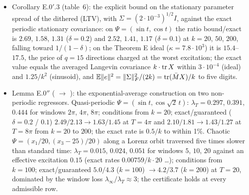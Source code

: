 \begin{itemize}
    regressors, the envelope along trajectories, the ordering explicit $\le$ exact, the $\omega^{-2}$ law, the
    no-growth of the ratio as the gains shrink, and the explicit nonlinear envelope of Theorem E on the implemented
    closed loop (single-kernel instance with $G=0.3\,I$, where $r_0\approx10^{-5}$ in the $w$-coordinates and the
    explicit nonlinear rate is $3.7\cdot10^{-5}$: the inequality holds at every sample over 8000\,s, about 0.3
    e-folds of the explicit envelope, while the state itself decays by far more). Lemma E.0$'$: the certificate and
    the sharpness on $\Psi=(\sin t,\cos t)$ ($k=20$, $50$, $200$; ratio $\to1/(1-\delta)$) and on the slow-adaptation
    ideal at $k=400$ (ratio $\le1.5$; more than $10^4$ above Lemma E.0's rate). Corollary E.0$'$.2: the explicit
    envelope on the implemented single-kernel loop at $k_e=40$ over 1.5 e-folds ($\mathrm{d}t=0.005$, below the
    fixed-step discretisation floor).
  \item Corollary E.0$'$.3 (table~6): the explicit bound on the stationary parameter spread of the dithered (LTV),
    with $\Sigma=(2\cdot10^{-3})^{1/2}I$, against the exact periodic stationary covariance: on $\Psi=(\sin t,\cos t)$
    the ratio bound/exact is $2.69$, $1.58$, $1.31$ ($\delta=0.2$) and $2.52$, $1.41$, $1.17$ ($\delta=0.1$) at
    $k=20$, $50$, $200$, falling toward $1/(1-\delta)$; on the Theorem E ideal ($\kappa=7.8\cdot10^3$) it is
    $15.4$--$17.5$, the price of $q=15$ directions charged at the worst excitation; the exact value equals the
    averaged Langevin covariance $k\cdot\operatorname{tr} X$ within $3\cdot10^{-4}$ (ideal) and $1.25/k^2$ (sinusoid), and
    $\mathbb{E}\lVert e\rVert^2=\lVert \Sigma\rVert_F^2/(2k)=\operatorname{tr}(\bar MX)/k$ to five digits.
  \item Lemma E.0$''$ ( $\to$ ): the exponential-average
    construction on two non-periodic regressors. Quasi-periodic $\Psi=(\sin t,\cos\sqrt2\,t)$: $\lambda_T=0.297$,
    $0.391$, $0.444$ for windows $2\pi$, $4\pi$, $8\pi$; conditions from $k=20$; exact/guaranteed
    ($\delta=0.2$ / $0.1$) $2.49/2.13\to1.63/1.45$ at $T=4\pi$ and $2.10/1.81\to1.43/1.27$ at $T=8\pi$ from $k=20$ to
    $200$; the exact rate is $0.5/k$ to within 1\%. Chaotic $\Psi=(x_1/20,(x_3-25)/20)$ along a Lorenz orbit traversed
    five times slower than standard time: $\lambda_T=0.015$, $0.024$, $0.051$ for windows $5$, $10$, $20$ against an
    effective excitation $0.15$ (exact rates $0.00759/k\cdot20$ \dots); conditions from $k=100$; exact/guaranteed
    $5.0/4.3$ ($k=100$) $\to4.2/3.7$ ($k=200$) at $T=20$, dominated by the window loss
    $\lambda_\infty/\lambda_T\approx3$; the certificate holds at every admissible row.
\end{itemize}

